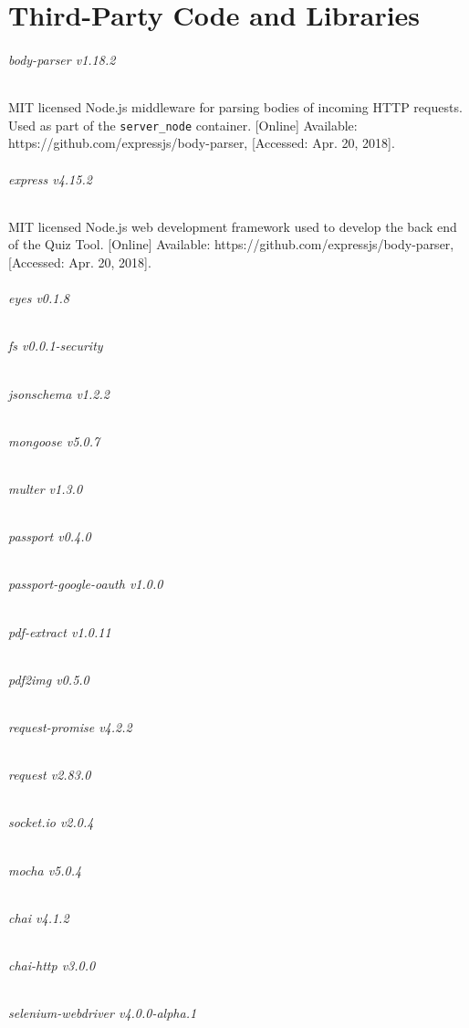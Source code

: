 \chapter{Third-Party Code and Libraries}
%
%
%
%
%

\subparagraph{body-parser v1.18.2}
MIT licensed Node.js middleware for parsing bodies of incoming HTTP requests. Used as part of the
\texttt{server\_node} container. [Online] Available: https://github.com/expressjs/body-parser, [Accessed: Apr. 20, 2018].

\subparagraph{express v4.15.2}
MIT licensed Node.js web development framework used to develop the back end of the Quiz Tool.
[Online] Available: https://github.com/expressjs/body-parser, [Accessed: Apr. 20, 2018].

\subparagraph{eyes v0.1.8}

\subparagraph{fs v0.0.1-security}
\subparagraph{jsonschema v1.2.2}
\subparagraph{mongoose v5.0.7}
\subparagraph{multer v1.3.0}
\subparagraph{passport v0.4.0}
\subparagraph{passport-google-oauth v1.0.0}
\subparagraph{pdf-extract v1.0.11}
\subparagraph{pdf2img v0.5.0}
\subparagraph{request-promise v4.2.2}
\subparagraph{request v2.83.0}
\subparagraph{socket.io v2.0.4}
\subparagraph{mocha v5.0.4}
\subparagraph{chai v4.1.2}
\subparagraph{chai-http v3.0.0}
\subparagraph{selenium-webdriver v4.0.0-alpha.1}

